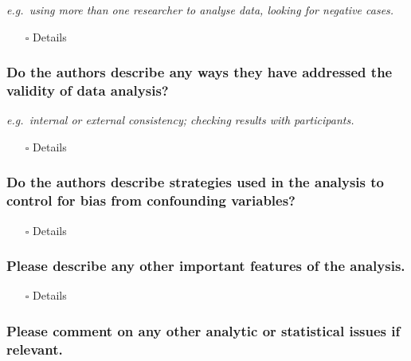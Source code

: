 \documentclass[
  doc, a4paper]{apa7}
\providecommand{\tightlist}{%
  \setlength{\itemsep}{0pt}\setlength{\parskip}{0pt}}
\begin{document}
\emph{e.g.~using more than one researcher to analyse data, looking for negative cases.}

\begin{itemize}
\tightlist
\item[$\square$]
  Details
\end{itemize}

\subsubsection{Do the authors describe any ways they have addressed the validity of data analysis?}\label{do-the-authors-describe-any-ways-they-have-addressed-the-validity-of-data-analysis}

\emph{e.g.~internal or external consistency; checking results with participants.}

\begin{itemize}
\tightlist
\item[$\square$]
  Details
\end{itemize}

\subsubsection{Do the authors describe strategies used in the analysis to control for bias from confounding variables?}\label{do-the-authors-describe-strategies-used-in-the-analysis-to-control-for-bias-from-confounding-variables}

\begin{itemize}
\tightlist
\item[$\square$]
  Details
\end{itemize}

\subsubsection{Please describe any other important features of the analysis.}\label{please-describe-any-other-important-features-of-the-analysis.}

\begin{itemize}
\tightlist
\item[$\square$]
  Details
\end{itemize}

\subsubsection{Please comment on any other analytic or statistical issues if relevant.}\label{please-comment-on-any-other-analytic-or-statistical-issues-if-relevant.}
\end{document}
